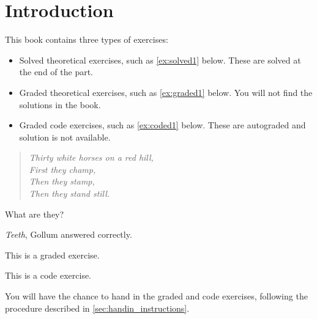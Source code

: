 

\section{Introduction}



This book contains three types of exercises:


\begin{itemize}

  \item Solved theoretical exercises, such as \cref{ex:solved1} below. These are solved at the end of the part.
  \item Graded theoretical exercises, such as \cref{ex:graded1} below. You will not find the solutions in the book.
  \item Graded code exercises, such as \cref{ex:coded1} below. These are autograded and solution is not available.
\end{itemize}

\begin{exercise}
  \label{ex:solved1}
  \begin{quote}
    \itshape
    Thirty white horses on a red hill,\\
    First they champ,\\
    Then they stamp,\\
    Then they stand still.
    \end{quote}
    What are they?
\end{exercise}
\begin{solution}
  \emph{Teeth}, Gollum answered correctly.
\end{solution}

\begin{gradedexercise}
  \label{ex:graded1} This is a graded exercise.
\end{gradedexercise}

\begin{codeexercise}
  \label{ex:coded1}
  This is a code exercise.
\end{codeexercise}

You will have the chance to hand in the graded and code exercises, following the procedure described in \cref{sec:handin_instructions}.
